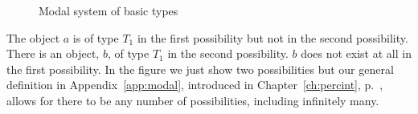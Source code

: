 \begin{figure}[h]
\begin{adjustbox}{max width=\textwidth}
\begin{tikzpicture}


    




    
\end{tikzpicture}
\end{adjustbox}

\caption{Modal system of basic types}
\label{fig:modal}
\end{figure}
The object $a$ is
of type $T_1$ in the first possibility but not in the second
possibility.  There is an object, $b$, of type $T_1$ in the second
possibility.  $b$ does not exist at all in the first possibility.
In the
figure we just show two possibilities but our general definition in
Appendix~\ref{app:modal}, introduced in Chapter~\ref{ch:percint}, p.~\pageref{ex:modalsys-complex},
allows for there to be any number of possibilities, including
infinitely many.

